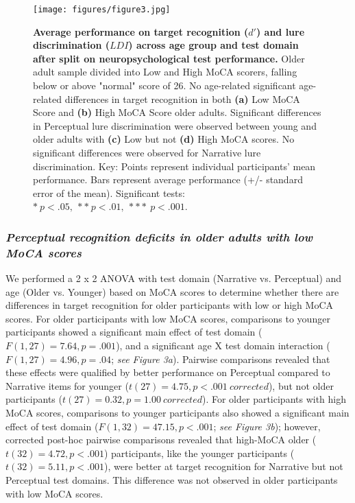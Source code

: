\documentclass[11pt]{article}
\begin{document}
\begin{figure}
\centering
\texttt{[image: figures/figure3.jpg]}
\caption{\small \textbf{Average performance on target recognition ($d'$) and lure discrimination ($LDI$) across age group and test domain after split on neuropsychological test performance.} Older adult sample divided into Low and High MoCA scorers, falling below or above "normal" score of 26. No age-related significant age-related differences in target recognition in both \textbf{(a)} Low MoCA Score and \textbf{(b)} High MoCA Score older adults. Significant differences in Perceptual lure discrimination were observed between young and older adults with \textbf{(c)} Low but not \textbf{(d)} High MoCA scores. No significant differences were observed for Narrative lure discrimination. Key: Points represent individual participants' mean performance. Bars represent average performance (+/- standard error of the mean). Significant tests: $* \ p < .05, \ ** \ p < .01, \ *** \ p < .001$.}
\label{fig:schematic}
\end{figure}

\subsubsection*{\textit{Perceptual recognition deficits in older adults with low MoCA scores}}
We performed a 2 x 2 ANOVA with test domain (Narrative vs. Perceptual) and age (Older vs. Younger) based on MoCA scores to determine whether there are differences in target recognition for older participants with low or high MoCA scores. For older participants with low MoCA scores, comparisons to younger participants showed a significant main effect of test domain ($F(1, 27) = 7.64, p = .001$), and a significant age X test domain interaction ($F(1, 27) = 4.96, p = .04$; \textit{see Figure 3a}). Pairwise comparisons revealed that these effects were qualified by better performance on Perceptual compared to Narrative items for younger ($t(27) = 4.75, p < .001 \ corrected$), but not older participants ($t(27) = 0.32, p = 1.00 \ corrected$). For older participants with high MoCA scores, comparisons to younger participants also showed a significant main effect of test domain ($F(1, 32) = 47.15, p < .001$; \textit{see Figure 3b}); however, corrected post-hoc pairwise comparisons revealed that high-MoCA older ($t(32) = 4.72, p < .001$) participants, like the younger participants ($t(32) = 5.11, p < .001$), were better at target recognition for Narrative but not Perceptual test domains. This difference was not observed in older participants with low MoCA scores. 
\end{document}

